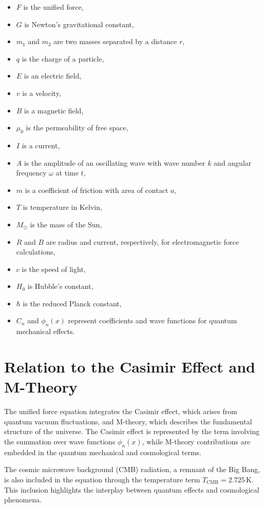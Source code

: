 \documentclass[12pt, a4paper]{article}
\begin{document}
\begin{itemize}
    \item $F$ is the unified force,
    \item $G$ is Newton's gravitational constant,
    \item $m_1$ and $m_2$ are two masses separated by a distance $r$,
    \item $q$ is the charge of a particle,
    \item $E$ is an electric field,
    \item $v$ is a velocity,
    \item $B$ is a magnetic field,
    \item $\mu_0$ is the permeability of free space,
    \item $I$ is a current,
    \item $A$ is the amplitude of an oscillating wave with wave number $k$ and angular frequency $\omega$ at time $t$,
    \item $m$ is a coefficient of friction with area of contact $a$,
    \item $T$ is temperature in Kelvin,
    \item $M_{\odot}$ is the mass of the Sun,
    \item $R$ and $B$ are radius and current, respectively, for electromagnetic force calculations,
    \item $c$ is the speed of light,
    \item $H_0$ is Hubble's constant,
    \item $\hbar$ is the reduced Planck constant,
    \item $C_n$ and $\phi_n(x)$ represent coefficients and wave functions for quantum mechanical effects.
\end{itemize}

\section{Relation to the Casimir Effect and M-Theory}
The unified force equation integrates the Casimir effect, which arises from quantum vacuum fluctuations, and M-theory, which describes the fundamental structure of the universe. The Casimir effect is represented by the term involving the summation over wave functions $\phi_n(x)$, while M-theory contributions are embedded in the quantum mechanical and cosmological terms.

The cosmic microwave background (CMB) radiation, a remnant of the Big Bang, is also included in the equation through the temperature term $T_{\text{CMB}} = 2.725 \, \text{K}$. This inclusion highlights the interplay between quantum effects and cosmological phenomena.
\end{document}
